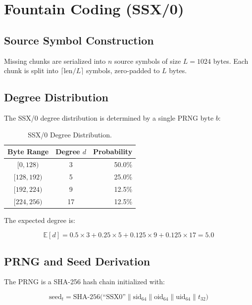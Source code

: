 \documentclass[11pt,twocolumn]{article}
\theoremstyle{definition}
\begin{document}
\section{Fountain Coding (SSX/0)}
\label{sec:ssx}

\subsection{Source Symbol Construction}

Missing chunks are serialized into $n$ source symbols of size
$L = 1024$ bytes. Each chunk is split into $\lceil \text{len}/L \rceil$
symbols, zero-padded to $L$ bytes.

\subsection{Degree Distribution}

The SSX/0 degree distribution is determined by a single PRNG byte $b$:

\begin{table}[t]
\centering
\caption{SSX/0 Degree Distribution.}
\label{tab:degree}
\begin{tabular}{@{}ccr@{}}
\toprule
Byte Range & Degree $d$ & Probability \\
\midrule
$[0, 128)$   & 3  & 50.0\% \\
$[128, 192)$ & 5  & 25.0\% \\
$[192, 224)$ & 9  & 12.5\% \\
$[224, 256)$ & 17 & 12.5\% \\
\bottomrule
\end{tabular}
\end{table}

The expected degree is:

\begin{equation}
  \mathbb{E}[d] = 0.5 \times 3 + 0.25 \times 5 + 0.125 \times 9 +
  0.125 \times 17 = 5.0
\end{equation}

\subsection{PRNG and Seed Derivation}

The PRNG is a SHA-256 hash chain initialized with:

\begin{equation}
  \text{seed}_t = \text{SHA-256}\bigl(\text{``SSX0''} \|
  \text{sid}_{64} \| \text{oid}_{64} \| \text{uid}_{64} \|
  t_{32}\bigr)
\end{equation}
\end{document}
